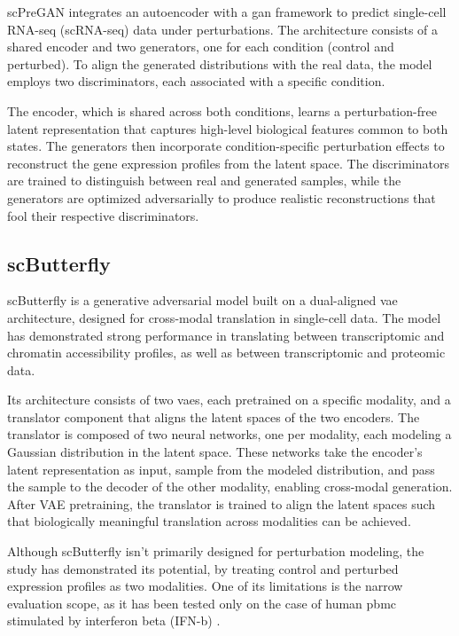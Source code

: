 \documentclass[12pt, a4paper]{article}
\begin{document}
scPreGAN integrates an autoencoder with a \gls{gan} framework to predict single-cell RNA-seq (scRNA-seq) data under perturbations. The architecture consists of a shared encoder and two generators, one for each condition (control and perturbed). To align the generated distributions with the real data, the model employs two discriminators, each associated with a specific condition.

The encoder, which is shared across both conditions, learns a perturbation-free latent representation that captures high-level biological features common to both states. The generators then incorporate condition-specific perturbation effects to reconstruct the gene expression profiles from the latent space. The discriminators are trained to distinguish between real and generated samples, while the generators are optimized adversarially to produce realistic reconstructions that fool their respective discriminators.


\subsection{scButterfly}


scButterfly is a generative adversarial model built on a dual-aligned \gls{vae} architecture, designed for cross-modal translation in single-cell data. The model has demonstrated strong performance in translating between transcriptomic and chromatin accessibility profiles, as well as between transcriptomic and proteomic data.

Its architecture consists of two \gls{vae}s, each pretrained on a specific modality, and a translator component that aligns the latent spaces of the two encoders. The translator is composed of two neural networks, one per modality, each modeling a Gaussian distribution in the latent space. These networks take the encoder's latent representation as input, sample from the modeled distribution, and pass the sample to the decoder of the other modality, enabling cross-modal generation.
After VAE pretraining, the translator is trained to align the latent spaces such that biologically meaningful translation across modalities can be achieved.

Although scButterfly isn't primarily designed for perturbation modeling, the study has demonstrated its potential, by treating control and perturbed expression profiles as two modalities. One of its limitations is the narrow evaluation scope, as it has been tested only on the case of human \gls{pbmc} stimulated by interferon beta (IFN-b) \cite{kanaGenerativeModelingSinglecell2023}.
\end{document}
